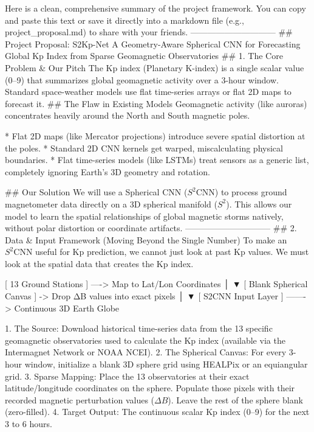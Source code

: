 Here is a clean, comprehensive summary of the project framework. You can copy and paste this text or save it directly into a markdown file (e.g., project_proposal.md) to share with your friends.
------------------------------
## Project Proposal: S2Kp-Net
A Geometry-Aware Spherical CNN for Forecasting Global Kp Index from Sparse Geomagnetic Observatories
## 1. The Core Problem & Our Pitch
The Kp index (Planetary K-index) is a single scalar value (0–9) that summarizes global geomagnetic activity over a 3-hour window. Standard space-weather models use flat time-series arrays or flat 2D maps to forecast it.
## The Flaw in Existing Models
Geomagnetic activity (like auroras) concentrates heavily around the North and South magnetic poles.

* Flat 2D maps (like Mercator projections) introduce severe spatial distortion at the poles.
* Standard 2D CNN kernels get warped, miscalculating physical boundaries.
* Flat time-series models (like LSTMs) treat sensors as a generic list, completely ignoring Earth's 3D geometry and rotation.

## Our Solution
We will use a Spherical CNN ($S^2\text{CNN}$) to process ground magnetometer data directly on a 3D spherical manifold ($S^2$). This allows our model to learn the spatial relationships of global magnetic storms natively, without polar distortion or coordinate artifacts.
------------------------------
## 2. Data & Input Framework (Moving Beyond the Single Number)
To make an $S^2\text{CNN}$ useful for Kp prediction, we cannot just look at past Kp values. We must look at the spatial data that creates the Kp index.

       [ 13 Ground Stations ] ----> Map to Lat/Lon Coordinates
                                              │
                                              ▼
       [ Blank Spherical Canvas ] -> Drop ΔB values into exact pixels
                                              │
                                              ▼
       [ S2CNN Input Layer ] -------> Continuous 3D Earth Globe


   1. The Source: Download historical time-series data from the 13 specific geomagnetic observatories used to calculate the Kp index (available via the Intermagnet Network or NOAA NCEI).
   2. The Spherical Canvas: For every 3-hour window, initialize a blank 3D sphere grid using HEALPix or an equiangular grid.
   3. Sparse Mapping: Place the 13 observatories at their exact latitude/longitude coordinates on the sphere. Populate those pixels with their recorded magnetic perturbation values ($\Delta B$). Leave the rest of the sphere blank (zero-filled).
   4. Target Output: The continuous scalar Kp index (0–9) for the next 3 to 6 hours.

